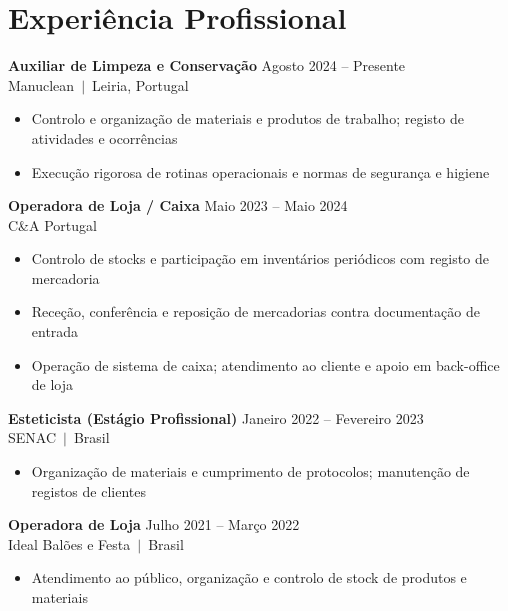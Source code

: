 \documentclass[10pt,a4paper]{article}
\begin{document}
\section{Experiência Profissional}

{\small\bfseries Auxiliar de Limpeza e Conservação}\hfill{\small\color{subtle} Agosto 2024 -- Presente}\\
{\small\color{accent} Manuclean~$|$~Leiria, Portugal}
\begin{itemize}\small
  \item Controlo e organização de materiais e produtos de trabalho; registo de atividades e ocorrências
  \item Execução rigorosa de rotinas operacionais e normas de segurança e higiene
\end{itemize}

\vspace{3pt}
{\small\bfseries Operadora de Loja / Caixa}\hfill{\small\color{subtle} Maio 2023 -- Maio 2024}\\
{\small\color{accent} C\&A Portugal}
\begin{itemize}\small
  \item Controlo de stocks e participação em inventários periódicos com registo de mercadoria
  \item Receção, conferência e reposição de mercadorias contra documentação de entrada
  \item Operação de sistema de caixa; atendimento ao cliente e apoio em back-office de loja
\end{itemize}

\vspace{3pt}
{\small\bfseries Esteticista (Estágio Profissional)}\hfill{\small\color{subtle} Janeiro 2022 -- Fevereiro 2023}\\
{\small\color{accent} SENAC~$|$~Brasil}
\begin{itemize}\small
  \item Organização de materiais e cumprimento de protocolos; manutenção de registos de clientes
\end{itemize}

\vspace{3pt}
{\small\bfseries Operadora de Loja}\hfill{\small\color{subtle} Julho 2021 -- Março 2022}\\
{\small\color{accent} Ideal Balões e Festa~$|$~Brasil}
\begin{itemize}\small
  \item Atendimento ao público, organização e controlo de stock de produtos e materiais
\end{itemize}
\end{document}
